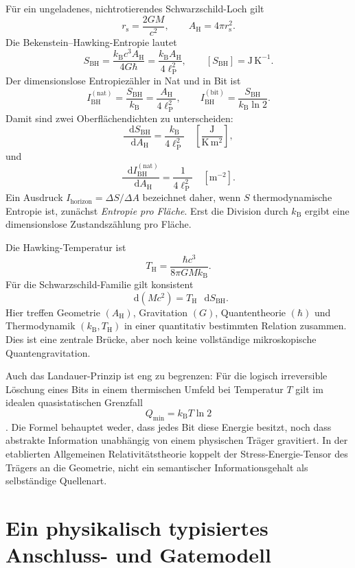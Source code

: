 \documentclass[11pt,a4paper]{article}
\theoremstyle{remark}
\newcommand{\dd}{\mathop{}\!\mathrm{d}}
\begin{document}
Für ein ungeladenes, nichtrotierendes Schwarzschild-Loch gilt
\[
  r_{\mathrm s}=\frac{2GM}{c^2},
  \qquad A_{\mathrm H}=4\pi r_{\mathrm s}^2.
\]
Die Bekenstein--Hawking-Entropie lautet \citep{bekenstein1973,hawking1975}
\[
  S_{\mathrm{BH}}
  =\frac{k_{\mathrm B}c^3A_{\mathrm H}}{4G\hbar}
  =\frac{k_{\mathrm B}A_{\mathrm H}}{4\ell_{\mathrm P}^2},
  \qquad [S_{\mathrm{BH}}]=\mathrm{J\,K^{-1}}.
\]
Der dimensionslose Entropiezähler in Nat und in Bit ist
\[
  I_{\mathrm{BH}}^{(\mathrm{nat})}
  =\frac{S_{\mathrm{BH}}}{k_{\mathrm B}}
  =\frac{A_{\mathrm H}}{4\ell_{\mathrm P}^2},
  \qquad
  I_{\mathrm{BH}}^{(\mathrm{bit})}
  =\frac{S_{\mathrm{BH}}}{k_{\mathrm B}\ln2}.
\]
Damit sind zwei Oberflächendichten zu unterscheiden:
\[
  \frac{\dd S_{\mathrm{BH}}}{\dd A_{\mathrm H}}
  =\frac{k_{\mathrm B}}{4\ell_{\mathrm P}^2}
  \quad\left[\frac{\mathrm J}{\mathrm{K\,m^2}}\right],
\]
und
\[
  \frac{\dd I_{\mathrm{BH}}^{(\mathrm{nat})}}{\dd A_{\mathrm H}}
  =\frac{1}{4\ell_{\mathrm P}^2}
  \quad[\mathrm{m^{-2}}].
\]
Ein Ausdruck \(I_{\mathrm{horizon}}=\Delta S/\Delta A\) bezeichnet daher,
wenn \(S\) thermodynamische Entropie ist, zunächst \emph{Entropie pro
Fläche}. Erst die Division durch \(k_{\mathrm B}\) ergibt eine
dimensionslose Zustandszählung pro Fläche.

Die Hawking-Temperatur ist
\[
  T_{\mathrm H}=\frac{\hbar c^3}{8\pi GMk_{\mathrm B}}.
\]
Für die Schwarzschild-Familie gilt konsistent
\[
  \dd(Mc^2)=T_{\mathrm H}\,\dd S_{\mathrm{BH}}.
\]
Hier treffen Geometrie \((A_{\mathrm H})\), Gravitation \((G)\),
Quantentheorie \((\hbar)\) und Thermodynamik
\((k_{\mathrm B},T_{\mathrm H})\) in einer quantitativ bestimmten Relation
zusammen. Dies ist eine zentrale Brücke, aber noch keine vollständige
mikroskopische Quantengravitation.

Auch das Landauer-Prinzip ist eng zu begrenzen: Für die logisch irreversible
Löschung eines Bits in einem thermischen Umfeld bei Temperatur \(T\) gilt im
idealen quasistatischen Grenzfall
\[
  Q_{\min}=k_{\mathrm B}T\ln2
\]
\citep{landauer1961}. Die Formel behauptet weder, dass jedes Bit diese
Energie besitzt, noch dass abstrakte Information unabhängig von einem
physischen Träger gravitiert. In der etablierten Allgemeinen
Relativitätstheorie koppelt der Stress-Energie-Tensor des Trägers an die
Geometrie, nicht ein semantischer Informationsgehalt als selbständige
Quellenart.

\section{Ein physikalisch typisiertes Anschluss- und Gatemodell}
\label{sec:phys-gate}
\end{document}
